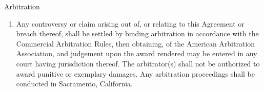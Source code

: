 \underline{Arbitration}
\begin{enumerate}[
    ref = \SecondLevelEnumerator
]
    \item Any controversy or claim arising out of, or relating to this
    Agreement or breach thereof, shall be settled by binding arbitration in
    accordance with the Commercial Arbitration Rules, then obtaining, of
    the American Arbitration Association, and judgement upon the award
    rendered may be entered in any court having jurisdiction thereof. The
    arbitrator(s) shall not be authorized to award punitive or exemplary
    damages. Any arbitration proceedings shall be conducted in Sacramento,
    California.
\end{enumerate}